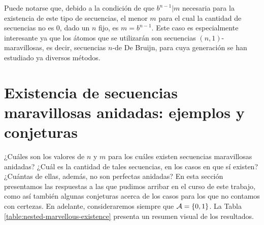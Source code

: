 Puede notarse que, debido a la condición de que $b^{n-1} \vert m$ necesaria
para la existencia de este tipo de secuencias, el menor $m$ para el cual la
cantidad de secuencias no es $0$, dado un $n$ fijo, es $m = b^{n-1}$. Este caso
es especialmente interesante ya que los átomos que se utilizarán son secuencias
$(n, 1)$-maravillosas, es decir, secuencias $n$-de De Bruijn, para cuya
generación se han estudiado ya diversos métodos.

\newpage

\chapter{Existencia de secuencias maravillosas anidadas: ejemplos y conjeturas}
\label{chapter:examples-and-conjectures}

¿Cuáles son los valores de $n$ y $m$ para los cuáles existen secuencias
maravillosas anidadas? ¿Cuál es la cantidad de tales secuencias, en los casos
en que sí existen? ¿Cuántas de ellas, además, no son perfectas anidadas?
En esta sección presentamos las respuestas a las que pudimos arribar en el curso
de este trabajo, como así también algunas conjeturas acerca de los casos para
los que no contamos con certezas. En adelante, consideraremos siempre que
$\mathcal{A} = \lbrace 0, 1 \rbrace$. La Tabla
\ref{table:nested-marvellous-existence} presenta un resumen visual de los
resultados.

